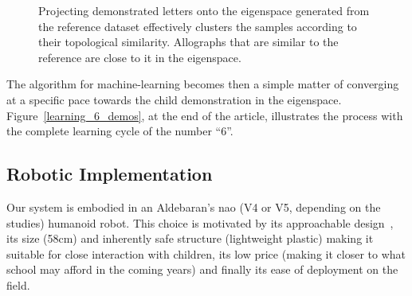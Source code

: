 \documentclass{article}
\begin{document}
\begin{figure}[ht!]
    \centering

    \caption{\small Projecting demonstrated letters onto the eigenspace
    generated from the reference dataset effectively clusters the samples
    according to their topological similarity. Allographs that are similar to
    the reference are close to it in the eigenspace.}
    \label{fig:h}
\end{figure}

The algorithm for machine-learning becomes then a simple matter of converging at
a specific pace towards the child demonstration in the eigenspace.
Figure~\ref{learning_6_demos}, at the end of the article, illustrates the
process with the complete learning cycle of the number ``6''.

\subsection{Robotic Implementation}

Our system is embodied in an Aldebaran's {\sc nao} (V4 or V5, depending on the
studies) humanoid robot. This choice is motivated by its approachable
design~\cite{Gouaillier2008}, its size (58cm) and inherently safe structure
(lightweight plastic) making it suitable for close interaction with children,
its low price (making it closer to what school may afford in the coming years)
and finally its ease of deployment on the field.
\end{document}
